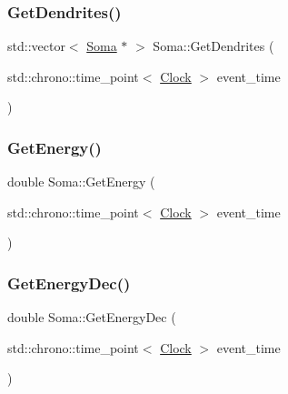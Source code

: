 \mbox{\label{classSoma_afdb0e40855f31f2d9a48f3b13c01b599}} 
\subsubsection{\texorpdfstring{Get\+Dendrites()}{GetDendrites()}}
{\footnotesize\ttfamily std\+::vector$<$ \mbox{\hyperlink{classSoma}{Soma}} $\ast$ $>$ Soma\+::\+Get\+Dendrites (\begin{DoxyParamCaption}\item[{std\+::chrono\+::time\+\_\+point$<$ \mbox{\hyperlink{universe_8h_a0ef8d951d1ca5ab3cfaf7ab4c7a6fd80}{Clock}} $>$}]{event\+\_\+time }\end{DoxyParamCaption})}

\mbox{\label{classSoma_a91dca73d2f5f97247cae0217a8c1440a}} 
\subsubsection{\texorpdfstring{Get\+Energy()}{GetEnergy()}}
{\footnotesize\ttfamily double Soma\+::\+Get\+Energy (\begin{DoxyParamCaption}\item[{std\+::chrono\+::time\+\_\+point$<$ \mbox{\hyperlink{universe_8h_a0ef8d951d1ca5ab3cfaf7ab4c7a6fd80}{Clock}} $>$}]{event\+\_\+time }\end{DoxyParamCaption})\hspace{0.3cm}{\ttfamily [inline]}}

\mbox{\label{classSoma_afbdc1f4e4f54adefea9a16fdca50aab5}} 
\subsubsection{\texorpdfstring{Get\+Energy\+Dec()}{GetEnergyDec()}}
{\footnotesize\ttfamily double Soma\+::\+Get\+Energy\+Dec (\begin{DoxyParamCaption}\item[{std\+::chrono\+::time\+\_\+point$<$ \mbox{\hyperlink{universe_8h_a0ef8d951d1ca5ab3cfaf7ab4c7a6fd80}{Clock}} $>$}]{event\+\_\+time }\end{DoxyParamCaption})\hspace{0.3cm}{\ttfamily [inline]}}


